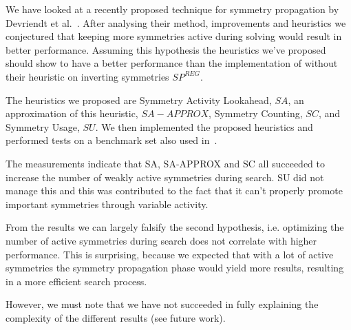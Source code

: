 We have looked at a recently proposed technique for symmetry propagation by Devriendt et al.~\cite{devriendt2012symmetry}.
After analysing their method, improvements and heuristics we conjectured that
keeping more symmetries active during solving would result in better performance.
Assuming this hypothesis the heuristics we've proposed should show to have a better performance than
the implementation of \cite{devriendt2012symmetry} without their heuristic on inverting symmetries
$SP^{REG}$.

The heuristics we proposed are Symmetry Activity Lookahead, $SA$, an approximation of this
heuristic, $SA-APPROX$, Symmetry Counting, $SC$, and Symmetry Usage, $SU$.
We then implemented the proposed heuristics and performed tests on a benchmark set also used
in~\cite{devriendt2012symmetry}.

The measurements indicate that SA, SA-APPROX and SC all succeeded to increase the number of weakly
active symmetries during search.
SU did not manage this and this was contributed to the fact that it can't properly promote important
symmetries through variable activity.

From the results we can largely falsify the second hypothesis, i.e. optimizing the number of
active symmetries during search does not correlate with higher performance.
This is surprising, because we expected that with a lot of active symmetries the symmetry
propagation phase would yield more results, resulting in a more efficient search process.

However, we must note that we have not succeeded in fully explaining the complexity of the
different results (see future work).

